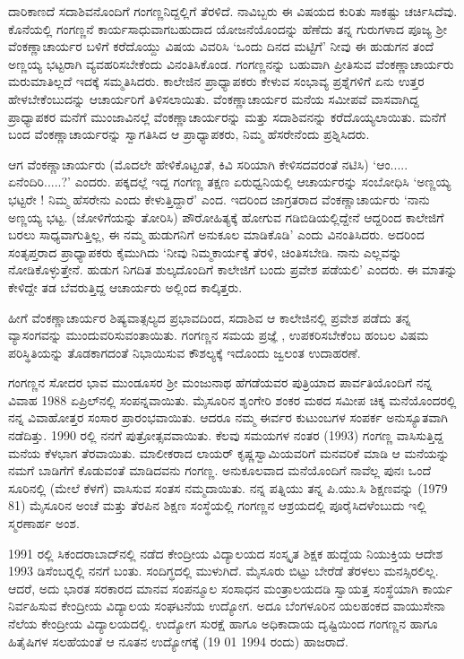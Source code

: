 {ದಾರಿಕಾಣದೆ ಸದಾಶಿವನೊಂದಿಗೆ ಗಂಗಣ್ಣನಿದ್ದಲ್ಲಿಗೆ ತೆರಳಿದೆ. ನಾವಿಬ್ಬರು ಈ ವಿಷಯದ ಕುರಿತು ಸಾಕಷ್ಟು ಚರ್ಚಿಸಿದೆವು. ಕೊನೆಯಲ್ಲಿ ಗಂಗಣ್ಣನೆ ಕಾರ್ಯಸಾಧುವಾಗ\-ಬಹುದಾದ ಯೋಜನೆಯೊಂದನ್ನು ಹೆಣೆದು ತನ್ನ ಗುರುಗಳಾದ ಪೂಜ್ಯ ಶ್ರೀ ವೆಂಕಣ್ಣಾಚಾರ್ಯರ ಬಳಿಗೆ ಕರೆದೊಯ್ದು ವಿಷಯ ವಿವರಿಸಿ ‘ಒಂದು ದಿನದ ಮಟ್ಟಿಗೆ’ ನೀವು ಈ ಹುಡುಗನ ತಂದೆ ಅಣ್ಣಯ್ಯ ಭಟ್ಟರಾಗಿ ವ್ಯವಹರಿಸಬೇಕೆಂದು ವಿನಂತಿಸಿಕೊಂಡ.
\hbox{ಗಂಗಣ್ಣನನ್ನು} ಬಹುವಾಗಿ ಪ್ರೀತಿಸುವ ವೆಂಕಣ್ಣಾಚಾರ್ಯರು ಮರುಮಾತಿಲ್ಲದೆ ಇದಕ್ಕೆ ಸಮ್ಮತಿಸಿದರು. ಕಾಲೇಜಿನ ಪ್ರಾಧ್ಯಾಪಕರು ಕೇಳುವ ಸಂಭಾವ್ಯ ಪ್ರಶ್ನೆಗಳಿಗೆ ಏನು ಉತ್ತರ ಹೇಳಬೇಕೆಂಬುದನ್ನು ಆಚಾರ್ಯರಿಗೆ ತಿಳಿಸಲಾಯಿತು. ವೆಂಕಣ್ಣಾಚಾರ್ಯರ ಮನೆಯ \hbox{ಸಮೀಪವೆ} ವಾಸವಾಗಿದ್ದ ಪ್ರಾಧ್ಯಾಪಕರ ಮನೆಗೆ ಮುಂಜಾವಿನಲ್ಲೆ ವೆಂಕಣ್ಣಾಚಾರ್ಯರನ್ನು ಮತ್ತು ಸದಾಶಿವನನ್ನು ಕರೆದೊಯ್ಯಲಾಯಿತು. ಮನೆಗೆ ಬಂದ ವೆಂಕಣ್ಣಾಚಾರ್ಯರನ್ನು ಸ್ವಾಗತಿಸಿದ ಆ ಪ್ರಾಧ್ಯಾಪಕರು, ನಿಮ್ಮ ಹೆಸರೇನೆಂದು ಪ್ರಶ್ನಿಸಿದರು. 

ಆಗ ವೆಂಕಣ್ಣಾಚಾರ್ಯರು (ಮೊದಲೇ ಹೇಳಿಕೊಟ್ಟಂತೆ, ಕಿವಿ ಸರಿಯಾಗಿ ಕೇಳಿಸದವರಂತೆ ನಟಿಸಿ) ‘ಆಂ..... ಏನೆಂದಿರಿ.....?’   \enginline{-}   ಎಂದರು. ಪಕ್ಕದಲ್ಲೆ ಇದ್ದ ಗಂಗಣ್ಣ ತಕ್ಷಣ ಏರುಧ್ವನಿಯಲ್ಲಿ ಆಚಾರ್ಯರನ್ನು ಸಂಬೋಧಿಸಿ ‘ಅಣ್ಣಯ್ಯ ಭಟ್ಟರೇ ! ನಿಮ್ಮ ಹೆಸರೇನು ಎಂದು ಕೇಳುತ್ತಿದ್ದಾರೆ’   \enginline{-}   ಎಂದ. ಇದರಿಂದ ಜಾಗ್ರತರಾದ ವೆಂಕಣ್ಣಾಚಾರ್ಯರು ‘ನಾನು ಅಣ್ಣಯ್ಯ ಭಟ್ಟ. (ಜೋಳಿಗೆಯನ್ನು ತೋರಿಸಿ) ಪೌರೋಹಿತ್ಯಕ್ಕೆ ಹೋಗುವ ಗಡಿಬಿಡಿಯಲ್ಲಿದ್ದೇನೆ ಆದ್ದರಿಂದ ಕಾಲೇಜಿಗೆ ಬರಲು ಸಾಧ್ಯವಾಗುತ್ತಿಲ್ಲ, ಈ ನಮ್ಮ ಹುಡುಗನಿಗೆ \hbox{ಅನುಕೂಲ} ಮಾಡಿಕೊಡಿ’   \enginline{-}   ಎಂದು ವಿನಂತಿಸಿದರು. ಅದರಿಂದ ಸಂತೃಪ್ತರಾದ ಪ್ರಾಧ್ಯಾಪಕರು ಕೈಮುಗಿದು ‘ನೀವು  ನಿಮ್ಮಕಾರ್ಯಕ್ಕೆ ತೆರಳಿ, ಚಿಂತಿಸಬೇಡಿ. ನಾನು ಎಲ್ಲವನ್ನು ನೋಡಿಕೊಳ್ಳುತ್ತೇನೆ. ಹುಡುಗ ನಿಗದಿತ ಶುಲ್ಕದೊಂದಿಗೆ ಕಾಲೇಜಿಗೆ ಬಂದು ಪ್ರವೇಶ ಪಡೆಯಲಿ’   \enginline{-}   ಎಂದರು. ಈ ಮಾತನ್ನು ಕೇಳಿದ್ದೇ ತಡ ಬೆವರುತ್ತಿದ್ದ ಆಚಾರ್ಯರು ಅಲ್ಲಿಂದ ಕಾಲ್ಕಿತ್ತರು.

ಹೀಗೆ ವೆಂಕಣ್ಣಾಚಾರ್ಯರ ಶಿಷ್ಯವಾತ್ಸಲ್ಯದ ಪ್ರಭಾವದಿಂದ, ಸದಾಶಿವ ಆ ಕಾಲೇಜಿನಲ್ಲಿ ಪ್ರವೇಶ ಪಡೆದು ತನ್ನ ವ್ಯಾಸಂಗವನ್ನು ಮುಂದುವರಿಸುವಂತಾಯಿತು. ಗಂಗಣ್ಣನ ಸಮಯ ಪ್ರಜ್ಞೆ , ಉಪಕರಿಸಬೇಕೆಂಬ ಹಂಬಲ ವಿಷಮ ಪರಿಸ್ಥಿತಿಯನ್ನು ತೊಡಕಾಗದಂತೆ ನಿಭಾಯಿಸುವ ಕೌಶಲ್ಯಕ್ಕೆ ಇದೊಂದು ಜ್ವಲಂತ ಉದಾಹರಣೆ. 

ಗಂಗಣ್ಣನ ಸೋದರ ಭಾವ ಮುಂಡೂಸರ ಶ್ರೀ ಮಂಜುನಾಥ ಹೆಗಡೆಯವರ ಪುತ್ರಿಯಾದ ಪಾರ್ವತಿಯೊಂದಿಗೆ ನನ್ನ ವಿವಾಹ 1988 ಏಪ್ರಿಲ್‍ನಲ್ಲಿ ಸಂಪನ್ನವಾಯಿತು. ಮೈಸೂರಿನ ಶೃಂಗೇರಿ ಶಂಕರ ಮಠದ ಸಮೀಪ ಚಿಕ್ಕ ಮನೆಯೊಂದರಲ್ಲಿ ನನ್ನ ವಿವಾಹೋತ್ತರ ಸಂಸಾರ ಪ್ರಾರಂಭವಾಯಿತು. ಆದರೂ ನಮ್ಮ ಈರ್ವರ ಕುಟುಂಬಗಳ ಸಂಪರ್ಕ ಅನುಸ್ಯೂತವಾಗಿ ನಡೆದಿತ್ತು. 1990 ರಲ್ಲಿ ನನಗೆ ಪುತ್ರೋತ್ಸವವಾಯಿತು. ಕೆಲವು ಸಮಯಗಳ ನಂತರ (1993) ಗಂಗಣ್ಣ ವಾಸಿಸುತ್ತಿದ್ದ ಮನೆಯ ಕೆಳಭಾಗ \hbox{ತೆರವಾಯಿತು.} ಮಾಲೀಕರಾದ ಲಾಯರ್ ಕೃಷ್ಣಸ್ವಾಮಿಯವರಿಗೆ ಮನವರಿಕೆ ಮಾಡಿ ಆ ಮನೆಯನ್ನು ನಮಗೆ ಬಾಡಿಗೆಗೆ ಕೊಡುವಂತೆ ಮಾಡಿದವನು ಗಂಗಣ್ಣ. ಅನುಕೂಲವಾದ ಮನೆ\-ಯೊಂದಿಗೆ ನಾವೆಲ್ಲ ಪುನಃ ಒಂದೆ ಸೂರಿನಲ್ಲಿ (ಮೇಲೆ  \enginline{-}  ಕೆಳಗೆ) ವಾಸಿಸುವ ಸಂತಸ ನಮ್ಮದಾಯಿತು. ನನ್ನ ಪತ್ನಿಯು ತನ್ನ ಪಿ.ಯು.ಸಿ ಶಿಕ್ಷಣವನ್ನು (1979  \enginline{-}  81) ಮೈಸೂರಿನ ಅಂಚೆ ಮತ್ತು ತೆರಪಿನ ಶಿಕ್ಷಣ ಸಂಸ್ಥೆಯಲ್ಲಿ ಗಂಗಣ್ಣನ ಆಶ್ರಯದಲ್ಲಿ ಪೂರೈಸಿದಳೆಂಬುದು ಇಲ್ಲಿ ಸ್ಮರಣಾರ್ಹ ಅಂಶ.

1991 ರಲ್ಲಿ ಸಿಕಂದರಾಬಾದ್‍ನಲ್ಲಿ ನಡೆದ ಕೇಂದ್ರೀಯ ವಿದ್ಯಾಲಯದ ಸಂಸ್ಕೃತ ಶಿಕ್ಷಕ ಹುದ್ದೆಯ ನಿಯುಕ್ತಿಯ ಆದೇಶ 1993 ಡಿಸೆಂಬರ್‍ನಲ್ಲಿ ನನಗೆ ಬಂತು. ಸಂದಿಗ್ಧದಲ್ಲಿ ಮುಳುಗಿದೆ. ಮೈಸೂರು ಬಿಟ್ಟು ಬೇರೆಡೆ ತೆರಳಲು ಮನಸ್ಸಿರಲಿಲ್ಲ. ಆದರೆ, ಅದು  ಭಾರತ ಸರಕಾರದ ಮಾನವ ಸಂಪನ್ಮೂಲ ಸಂಸಾಧನ ಮಂತ್ರಾಲಯದಡಿ ಸ್ವಾಯತ್ತ ಸಂಸ್ಥೆಯಾಗಿ ಕಾರ್ಯ ನಿರ್ವಹಿಸುವ ಕೇಂದ್ರೀಯ ವಿದ್ಯಾಲಯ ಸಂಘಟನೆಯ ಉದ್ಯೋಗ. ಅದೂ ಬೆಂಗಳೂರಿನ ಯಲಹಂಕದ ವಾಯುಸೇನಾ ನೆಲೆಯ ಕೇಂದ್ರೀಯ ವಿದ್ಯಾಲಯದಲ್ಲಿ. ಉದ್ಯೋಗ ಸುರಕ್ಷೆ ಹಾಗೂ ಅಧಿಕಾದಾಯ ದೃಷ್ಟಿಯಿಂದ ಗಂಗಣ್ಣನ ಹಾಗೂ ಹಿತೈಷಿಗಳ ಸಲಹೆಯಂತೆ ಆ ನೂತನ ಉದ್ಯೋಗಕ್ಕೆ (19  \enginline{-}  01  \enginline{-}  1994 ರಂದು) ಹಾಜರಾದೆ.

}
